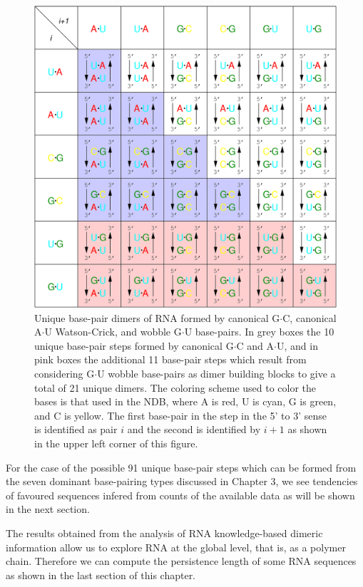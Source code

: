 \begin{figure}
\centering
\includegraphics[angle=0, scale=0.4]{Chapter4/unique.png}
\caption{Unique base-pair dimers of RNA formed by canonical G$\cdot$C,
  canonical A$\cdot$U  Watson-Crick, and wobble  G$\cdot$U base-pairs.
  In  grey boxes  the 10  unique base-pair  steps formed  by canonical
  G$\cdot$C  and  A$\cdot$U,  and  in  pink boxes  the  additional  11
  base-pair  steps  which  result  from considering  G$\cdot$U  wobble
  base-pairs as  dimer building  blocks to give  a total of  21 unique
  dimers. The coloring scheme used to  color the bases is that used in
  the NDB, where A is red, U is cyan, G is green, and C is yellow. The
  first base-pair in  the step in the 5' to 3'  sense is identified as
  pair $i$ and the second is identified by $i+1$ as shown in the upper
  left corner of this figure.}
\label{fig:unique}
\end{figure}  

For the  case of the possible  91 unique base-pair steps  which can be
formed from the seven  dominant base-pairing types discussed in Chapter
3,  we see tendencies of favoured sequences infered from counts of the
available data as will be shown in the next section. 

The results obtained from  the analysis of RNA knowledge-based dimeric
information allow us to explore RNA at the global level, that is, as a
polymer  chain. Therefore we can compute  the  persistence  length  of
some  RNA sequences as shown in the last section of this chapter.

